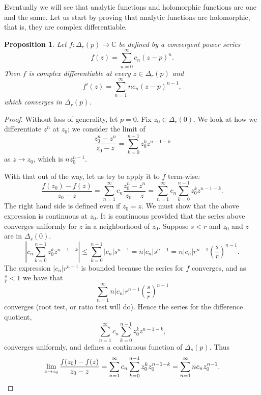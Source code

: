 \documentclass[12pt,openany]{book}
\newcommand{\sabs}[1]{\lvert {#1} \rvert}
\newcommand{\abs}[1]{\left\lvert {#1} \right\rvert}
\newcommand{\C}{{\mathbb{C}}}
\theoremstyle{plain}
\newtheorem{prop}[thm]{Proposition}
\theoremstyle{remark}
\theoremstyle{definition}
\theoremstyle{exercise}
\theoremstyle{example}
\begin{document}
Eventually we will see that analytic functions and holomorphic functions are
one and the same.  Let us start by proving that
analytic functions are holomorphic, that is, they are complex
differentiable.

\begin{prop}
Let $f \colon \Delta_r(p) \to \C$ be defined by a convergent power series
\begin{equation*}
f(z) = \sum_{n=0}^\infty c_n {(z-p)}^n .
\end{equation*}
Then $f$ is complex differentiable at every $z \in \Delta_r(p)$ and
\begin{equation*}
f'(z) = \sum_{n=1}^\infty n c_n {(z-p)}^{n-1} ,
\end{equation*}
which converges in $\Delta_r(p)$.
\end{prop}

\begin{proof}
Without loss of generality, let $p=0$.
Fix $z_0 \in \Delta_r(0)$.
We look at how we differentiate $z^n$ at $z_0$; we consider the limit of
\begin{equation*}
\frac{z_0^n-z^n}{z_0-z}
=
\sum_{k=0}^{n-1}
z_0^k z^{n-1-k}
\end{equation*}
as $z \to z_0$, which is $n z_0^{n-1}$.

With that out of the way, let us try to apply it to $f$
term-wise:
\begin{equation*}
\frac{f(z_0) - f(z)}{z_0-z}
=
\sum_{n=1}^\infty c_n \frac{z_0^n-z^n}{z_0-z}
=
\sum_{n=1}^\infty c_n \sum_{k=0}^{n-1} z_0^k z^{n-1-k} .
\end{equation*}
The right hand side is defined even if $z_0 = z$.
We must show that the above expression is continuous at $z_0$.
It is continuous provided that the series above
converges uniformly for $z$ in a
neighborhood of $z_0$.  Suppose $s < r$ and $z_0$ and $z$ are
in $\Delta_s(0)$.
\begin{equation*}
\abs{c_n \sum_{k=0}^{n-1} z_0^k z^{n-1-k}}
\leq
\sum_{k=0}^{n-1} 
\sabs{c_n} s^{n-1}
=
n
\sabs{c_n} s^{n-1}
=
n
\sabs{c_n} r^{n-1} {\left(\frac{s}{r}\right)}^{n-1} .
\end{equation*}
The expression
$\sabs{c_n} r^{n-1}$ is bounded because the series for $f$ converges,
and as $\frac{s}{r} < 1$ we have that
\begin{equation*}
\sum_{n=1}^\infty n \sabs{c_n} r^{n-1} {\left(\frac{s}{r}\right)}^{n-1} 
\end{equation*}
converges (root test, or ratio test will do).
Hence the series for the difference quotient,
\begin{equation*}
\sum_{n=1}^\infty c_n \sum_{k=0}^{n-1} z_0^k z^{n-1-k} ,
\end{equation*}
converges uniformly, and
defines a continuous function of $\Delta_s(p)$.  Thus
\begin{equation*}
\lim_{z \to z_0}
\frac{f(z_0)-f(z)}{z_0-z}
=
\sum_{n=1}^\infty c_n \sum_{k=0}^{n-1} z_0^k z_0^{n-1-k}
=
\sum_{n=1}^\infty n c_n z_0^{n-1} .
\qedhere
\end{equation*}
\end{proof}
\end{document}
